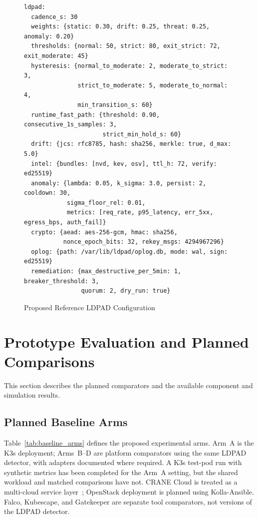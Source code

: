 \documentclass{ieeeaccess}
\begin{document}
\begin{figure}[t]
\caption{Proposed Reference LDPAD Configuration}
\label{fig:refconfig}
\begin{verbatim}
ldpad:
  cadence_s: 30
  weights: {static: 0.30, drift: 0.25, threat: 0.25, anomaly: 0.20}
  thresholds: {normal: 50, strict: 80, exit_strict: 72, exit_moderate: 45}
  hysteresis: {normal_to_moderate: 2, moderate_to_strict: 3,
               strict_to_moderate: 5, moderate_to_normal: 4,
               min_transition_s: 60}
  runtime_fast_path: {threshold: 0.90, consecutive_1s_samples: 3,
                      strict_min_hold_s: 60}
  drift: {jcs: rfc8785, hash: sha256, merkle: true, d_max: 5.0}
  intel: {bundles: [nvd, kev, osv], ttl_h: 72, verify: ed25519}
  anomaly: {lambda: 0.05, k_sigma: 3.0, persist: 2, cooldown: 30,
            sigma_floor_rel: 0.01,
            metrics: [req_rate, p95_latency, err_5xx, egress_bps, auth_fail]}
  crypto: {aead: aes-256-gcm, hmac: sha256,
           nonce_epoch_bits: 32, rekey_msgs: 4294967296}
  oplog: {path: /var/lib/ldpad/oplog.db, mode: wal, sign: ed25519}
  remediation: {max_destructive_per_5min: 1, breaker_threshold: 3,
                quorum: 2, dry_run: true}
\end{verbatim}
\end{figure}

\section{Prototype Evaluation and Planned Comparisons}
\label{sec:comparative}

This section describes the planned comparators and the available component and simulation results.

\subsection{Planned Baseline Arms}
\label{subsec:baselines}

Table~\ref{tab:baseline_arms} defines the proposed experimental arms. Arm~A is the K3s deployment; Arms~B--D are platform comparators using the same LDPAD detector, with adapters documented where required. A K3s test-pod run with synthetic metrics has been completed for the Arm~A setting, but the shared workload and matched comparisons have not. CRANE Cloud is treated as a multi-cloud service layer~\cite{b_crane}; OpenStack deployment is planned using Kolla-Ansible. Falco, Kubescape, and Gatekeeper are separate tool comparators, not versions of the LDPAD detector.
\end{document}

